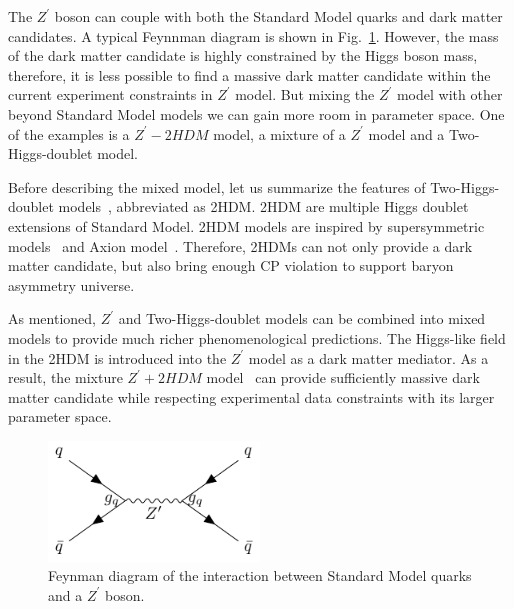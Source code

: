\par The $Z^\prime$ boson can couple with both the Standard Model quarks and dark matter candidates. A typical Feynnman diagram is shown in Fig.~\ref{fig:c2zprime}. However, the mass of the dark matter candidate is highly constrained by the Higgs boson mass, therefore, it is less possible to find a massive dark matter candidate within the current experiment constraints in $Z^{\prime}$ model. But mixing the $Z^{\prime}$ model with other beyond Standard Model models we can gain more room in parameter space. One of the examples is a $Z^{\prime}-2HDM$ model, a mixture of a $Z^{\prime}$ model and a Two-Higgs-doublet model.

\par Before describing the mixed model, let us summarize the features of Two-Higgs-doublet models~\cite{Branco:2011iw}, abbreviated as 2HDM. 2HDM are multiple Higgs doublet extensions of Standard Model. 2HDM models are inspired by supersymmetric models~\cite{Martin:1997ns} and Axion model~\cite{Peccei:2006as}. Therefore, 2HDMs can not only provide a dark matter candidate, but also bring enough CP violation to support baryon asymmetry universe.


\par As mentioned, $Z^{\prime}$ and Two-Higgs-doublet models can be combined into mixed models to provide much richer phenomenological predictions. The Higgs-like field in the 2HDM is introduced into the $Z^{\prime}$ model as a dark matter mediator. As a result, the mixture $Z^{\prime}+2HDM$ model~\cite{Berlin:2014cfa} can provide sufficiently massive dark matter candidate while respecting experimental data constraints with its larger parameter space.

\begin{figure}[htbp]
    \centering
    \includegraphics[width=0.5\textwidth]{chapters/c2/figures/z-prime}
    \caption{Feynman diagram of the interaction between Standard Model quarks and a $Z^{\prime}$ boson.}
    \label{fig:c2zprime}
\end{figure}

